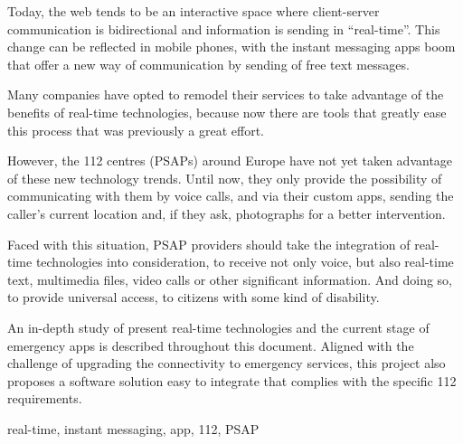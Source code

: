 \begin{abstractEn}
	Today, the web tends to be an interactive space where client-server communication is bidirectional and information is sending in “real-time”. This change can be reflected in mobile phones, with the instant messaging apps boom that offer a new way of communication by sending of free text messages.

	Many companies have opted to remodel their services to take advantage of the benefits of real-time technologies, because now there are tools that greatly ease this process that was previously a great effort.

	However, the 112 centres (PSAPs) around Europe have not yet taken advantage of these new technology trends. Until now, they only provide the possibility of communicating with them by voice calls, and via their custom apps, sending the caller’s current location and, if they ask, photographs for a better intervention.

	Faced with this situation, PSAP providers should take the integration of real-time technologies into consideration, to receive not only voice, but also real-time text, multimedia files, video calls or other significant information. And doing so, to provide universal access, to citizens with some kind of disability.

	An in-depth study of present real-time technologies and the current stage of emergency apps is described throughout this document. Aligned with the challenge of upgrading the connectivity to emergency services, this project also proposes a software solution easy to integrate that complies with the specific 112 requirements.
\end{abstractEn}

\begin{keywordsEn}
	real-time, instant messaging, app, 112, PSAP
\end{keywordsEn}
